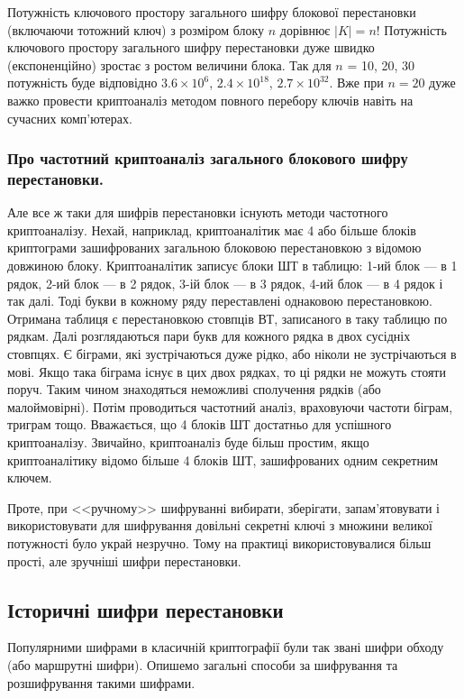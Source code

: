 Потужність ключового простору загального шифру блокової
перестановки (включаючи тотожний ключ) з розміром блоку $n$ дорівнює
$|K| = n!$ Потужність ключового простору загального шифру перестановки
дуже швидко (експоненційно) зростає з ростом величини блока. Так для $n$ =
10, 20, 30 потужність буде відповідно $3.6 \times 10^6$, $2.4 \times 10^{18}$,
$2.7 \times 10^{32}$. Вже при
$n = 20$ дуже важко провести криптоаналіз методом повного перебору ключів
навіть на сучасних комп’ютерах.

\subsubsection{Про частотний криптоаналіз загального блокового шифру перестановки.}

Але все ж таки для шифрів перестановки існують методи частотного
криптоаналізу. Нехай, наприклад, криптоаналітик має 4 або більше блоків
криптограми зашифрованих загальною блоковою перестановкою з відомою
довжиною блоку. Криптоаналітик записує блоки ШТ в таблицю: 1-ий блок --- в
1 рядок, 2-ий блок --- в 2 рядок, 3-ій блок --- в 3 рядок, 4-ий блок --- в 4 рядок і так
далі. Тоді букви в кожному ряду переставлені однаковою перестановкою.
Отримана таблиця є перестановкою стовпців ВТ, записаного в таку таблицю
по рядкам. Далі розглядаються пари букв для кожного рядка в двох сусідніх
стовпцях. Є біграми, які зустрічаються дуже рідко, або ніколи не
зустрічаються в мові. Якщо така біграма існує в цих двох рядках, то ці рядки
не можуть стояти поруч. Таким чином знаходяться неможливі сполучення
рядків (або малоймовірні). Потім проводиться частотний аналіз, враховуючи
частоти біграм, триграм тощо. Вважається, що 4 блоків ШТ достатньо для 
успішного криптоаналізу. Звичайно, криптоаналіз буде більш простим, якщо
криптоаналітику відомо більше 4 блоків ШТ, зашифрованих одним секретним
ключем.

Проте, при <<ручному>> шифруванні вибирати, зберігати, запам’ятовувати
і використовувати для шифрування довільні секретні ключі з множини
великої потужності було украй незручно. Тому на практиці
використовувалися більш прості, але зручніші шифри перестановки.

\subsection{Історичні шифри перестановки}

Популярними шифрами в класичній криптографії були так звані шифри
обходу (або маршрутні шифри). Опишемо загальні способи за шифрування та
розшифрування такими шифрами.

